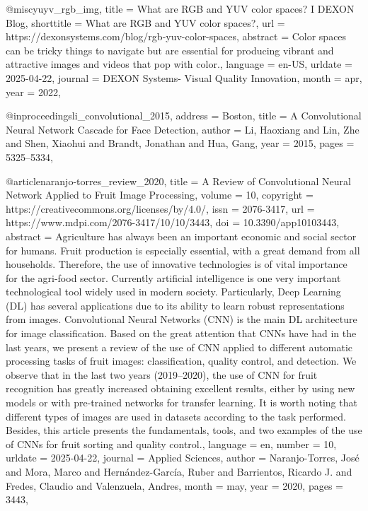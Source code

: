 {@misc{yuyv_rgb_img,
	title = {What are {RGB} and {YUV} color spaces? {I} {DEXON} {Blog}},
	shorttitle = {What are {RGB} and {YUV} color spaces?},
	url = {https://dexonsystems.com/blog/rgb-yuv-color-spaces},
	abstract = {Color spaces can be tricky things to navigate but are essential for producing vibrant and attractive images and videos that pop with color.},
	language = {en-US},
	urldate = {2025-04-22},
	journal = {DEXON Systems- Visual Quality Innovation},
	month = apr,
	year = {2022},
}

@inproceedings{li_convolutional_2015,
	address = {Boston},
	title = {A {Convolutional} {Neural} {Network} {Cascade} for {Face} {Detection}},
	author = {Li, Haoxiang and Lin, Zhe and Shen, Xiaohui and Brandt, Jonathan and Hua, Gang},
	year = {2015},
	pages = {5325--5334},
}

@article{naranjo-torres_review_2020,
	title = {A {Review} of {Convolutional} {Neural} {Network} {Applied} to {Fruit} {Image} {Processing}},
	volume = {10},
	copyright = {https://creativecommons.org/licenses/by/4.0/},
	issn = {2076-3417},
	url = {https://www.mdpi.com/2076-3417/10/10/3443},
	doi = {10.3390/app10103443},
	abstract = {Agriculture has always been an important economic and social sector for humans. Fruit production is especially essential, with a great demand from all households. Therefore, the use of innovative technologies is of vital importance for the agri-food sector. Currently artificial intelligence is one very important technological tool widely used in modern society. Particularly, Deep Learning (DL) has several applications due to its ability to learn robust representations from images. Convolutional Neural Networks (CNN) is the main DL architecture for image classification. Based on the great attention that CNNs have had in the last years, we present a review of the use of CNN applied to different automatic processing tasks of fruit images: classification, quality control, and detection. We observe that in the last two years (2019–2020), the use of CNN for fruit recognition has greatly increased obtaining excellent results, either by using new models or with pre-trained networks for transfer learning. It is worth noting that different types of images are used in datasets according to the task performed. Besides, this article presents the fundamentals, tools, and two examples of the use of CNNs for fruit sorting and quality control.},
	language = {en},
	number = {10},
	urldate = {2025-04-22},
	journal = {Applied Sciences},
	author = {Naranjo-Torres, José and Mora, Marco and Hernández-García, Ruber and Barrientos, Ricardo J. and Fredes, Claudio and Valenzuela, Andres},
	month = may,
	year = {2020},
	pages = {3443},
}

}
